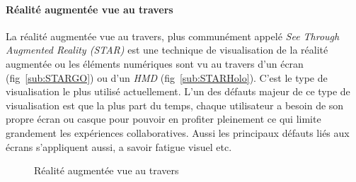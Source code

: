 \paragraph{Réalité augmentée vue au travers}
La réalité augmentée vue au travers, plus communément appelé \emph{See Through Augmented Reality (STAR)} est une technique de visualisation de la réalité augmentée ou les éléments numériques sont vu au travers d'un écran (fig~\ref{sub:STARGO}) ou d'un \emph{HMD} (fig~\ref{sub:STARHolo}). C'est le type de visualisation le plus  utilisé actuellement. L'un des défauts majeur de ce type de visualisation est que la plus part du temps, chaque utilisateur a besoin de son propre écran ou casque pour pouvoir en profiter pleinement ce qui limite grandement les expériences collaboratives. Aussi les principaux défauts liés aux écrans s'appliquent aussi, a savoir fatigue visuel etc.  

\begin{figure}[H]
    \centering
\caption{Réalité augmentée vue au travers}
\label{fig:STAR}
\end{figure}

